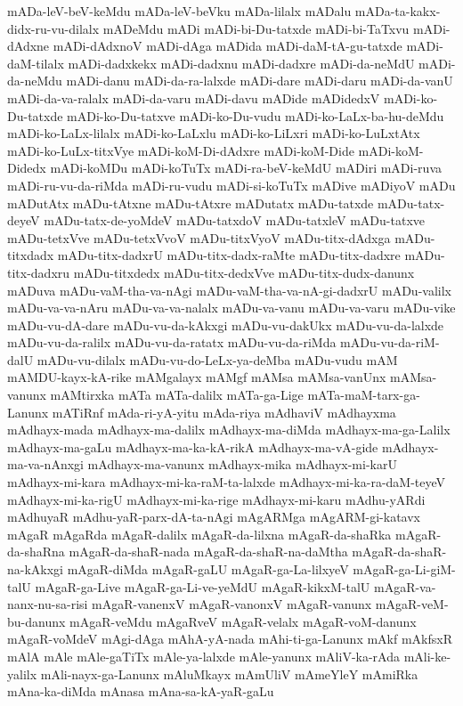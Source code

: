 {mADa-leV-beV-keMdu
mADa-leV-beVku
mADa-lilalx
mADalu
mADa-ta-kakx-didx-ru-vu-dilalx
mADeMdu
mADi
mADi-bi-Du-tatxde
mADi-bi-TaTxvu
mADi-dAdxne
mADi-dAdxnoV
mADi-dAga
mADida
mADi-daM-tA-gu-tatxde
mADi-daM-tilalx
mADi-dadxkekx
mADi-dadxnu
mADi-dadxre
mADi-da-neMdU
mADi-da-neMdu
mADi-danu
mADi-da-ra-lalxde
mADi-dare
mADi-daru
mADi-da-vanU
mADi-da-va-ralalx
mADi-da-varu
mADi-davu
mADide
mADidedxV
mADi-ko-Du-tatxde
mADi-ko-Du-tatxve
mADi-ko-Du-vudu
mADi-ko-LaLx-ba-hu-deMdu
mADi-ko-LaLx-lilalx
mADi-ko-LaLxlu
mADi-ko-LiLxri
mADi-ko-LuLxtAtx
mADi-ko-LuLx-titxVye
mADi-koM-Di-dAdxre
mADi-koM-Dide
mADi-koM-Didedx
mADi-koMDu
mADi-koTuTx
mADi-ra-beV-keMdU
mADiri
mADi-ruva
mADi-ru-vu-da-riMda
mADi-ru-vudu
mADi-si-koTuTx
mADive
mADiyoV
mADu
mADutAtx
mADu-tAtxne
mADu-tAtxre
mADutatx
mADu-tatxde
mADu-tatx-deyeV
mADu-tatx-de-yoMdeV
mADu-tatxdoV
mADu-tatxleV
mADu-tatxve
mADu-tetxVve
mADu-tetxVvoV
mADu-titxVyoV
mADu-titx-dAdxga
mADu-titxdadx
mADu-titx-dadxrU
mADu-titx-dadx-raMte
mADu-titx-dadxre
mADu-titx-dadxru
mADu-titxdedx
mADu-titx-dedxVve
mADu-titx-dudx-danunx
mADuva
mADu-vaM-tha-va-nAgi
mADu-vaM-tha-va-nA-gi-dadxrU
mADu-valilx
mADu-va-va-nAru
mADu-va-va-nalalx
mADu-va-vanu
mADu-va-varu
mADu-vike
mADu-vu-dA-dare
mADu-vu-da-kAkxgi
mADu-vu-dakUkx
mADu-vu-da-lalxde
mADu-vu-da-ralilx
mADu-vu-da-ratatx
mADu-vu-da-riMda
mADu-vu-da-riM-dalU
mADu-vu-dilalx
mADu-vu-do-LeLx-ya-deMba
mADu-vudu
mAM
mAMDU-kayx-kA-rike
mAMgalayx
mAMgf
mAMsa
mAMsa-vanUnx
mAMsa-vanunx
mAMtirxka
mATa
mATa-dalilx
mATa-ga-Lige
mATa-maM-tarx-ga-Lanunx
mATiRnf
mAda-ri-yA-yitu
mAda-riya
mAdhaviV
mAdhayxma
mAdhayx-mada
mAdhayx-ma-dalilx
mAdhayx-ma-diMda
mAdhayx-ma-ga-Lalilx
mAdhayx-ma-gaLu
mAdhayx-ma-ka-kA-rikA
mAdhayx-ma-vA-gide
mAdhayx-ma-va-nAnxgi
mAdhayx-ma-vanunx
mAdhayx-mika
mAdhayx-mi-karU
mAdhayx-mi-kara
mAdhayx-mi-ka-raM-ta-lalxde
mAdhayx-mi-ka-ra-daM-teyeV
mAdhayx-mi-ka-rigU
mAdhayx-mi-ka-rige
mAdhayx-mi-karu
mAdhu-yARdi
mAdhuyaR
mAdhu-yaR-parx-dA-ta-nAgi
mAgARMga
mAgARM-gi-katavx
mAgaR
mAgaRda
mAgaR-dalilx
mAgaR-da-lilxna
mAgaR-da-shaRka
mAgaR-da-shaRna
mAgaR-da-shaR-nada
mAgaR-da-shaR-na-daMtha
mAgaR-da-shaR-na-kAkxgi
mAgaR-diMda
mAgaR-gaLU
mAgaR-ga-La-lilxyeV
mAgaR-ga-Li-giM-talU
mAgaR-ga-Live
mAgaR-ga-Li-ve-yeMdU
mAgaR-kikxM-talU
mAgaR-va-nanx-nu-sa-risi
mAgaR-vanenxV
mAgaR-vanonxV
mAgaR-vanunx
mAgaR-veM-bu-danunx
mAgaR-veMdu
mAgaRveV
mAgaR-velalx
mAgaR-voM-danunx
mAgaR-voMdeV
mAgi-dAga
mAhA-yA-nada
mAhi-ti-ga-Lanunx
mAkf
mAkfsxR
mAlA
mAle
mAle-gaTiTx
mAle-ya-lalxde
mAle-yanunx
mAliV-ka-rAda
mAli-ke-yalilx
mAli-nayx-ga-Lanunx
mAluMkayx
mAmUliV
mAmeYleY
mAmiRka
mAna-ka-diMda
mAnasa
mAna-sa-kA-yaR-gaLu
}
